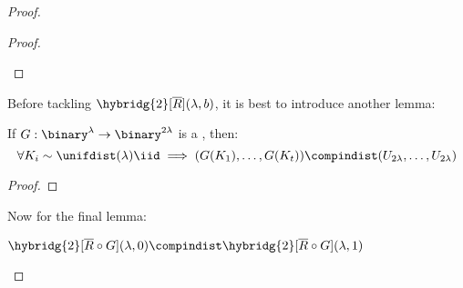 \begin{proof}
\begin{proof}
\begin{cryptoredux}

            \cseqbeginloop



            \cseqdelay


            \cseqendloop



        \end{cryptoredux}

    \end{proof}

    Before tackling $\hybridg{2}[\overline{R}](\lambda, b)$, it is best to introduce another lemma:

    \begin{lemma}
        If $G : \binary^\lambda \to \binary^{2 \lambda}$ is a \prg, then:
        \[
            \forall K_i \sim \unifdist(\lambda) \iid \implies (G(K_1), \dots , G(K_t)) \compindist (U_{2 \lambda}, \dots , U_{2\lambda}) \qedhere
        \]
    \end{lemma}

    \begin{proof}
    \end{proof}

    Now for the final lemma:

    \begin{lemma}
        $\hybridg{2}[\overline{R} \circ G](\lambda, 0) \compindist \hybridg{2}[\overline{R} \circ G](\lambda, 1)$       
    \end{lemma}
    

\end{proof}
